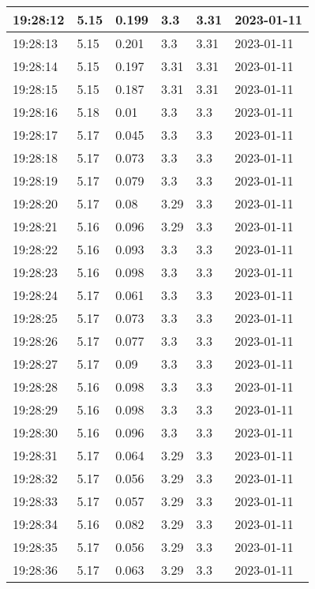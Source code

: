\begin{longtable}{|l|l|l|l|l|l|}
        19:28:12 & 5.15 & 0.199 & 3.3 & 3.31 & 2023-01-11 \\ \hline
        19:28:13 & 5.15 & 0.201 & 3.3 & 3.31 & 2023-01-11 \\ \hline
        19:28:14 & 5.15 & 0.197 & 3.31 & 3.31 & 2023-01-11 \\ \hline
        19:28:15 & 5.15 & 0.187 & 3.31 & 3.31 & 2023-01-11 \\ \hline
        19:28:16 & 5.18 & 0.01 & 3.3 & 3.3 & 2023-01-11 \\ \hline
        19:28:17 & 5.17 & 0.045 & 3.3 & 3.3 & 2023-01-11 \\ \hline
        19:28:18 & 5.17 & 0.073 & 3.3 & 3.3 & 2023-01-11 \\ \hline
        19:28:19 & 5.17 & 0.079 & 3.3 & 3.3 & 2023-01-11 \\ \hline
        19:28:20 & 5.17 & 0.08 & 3.29 & 3.3 & 2023-01-11 \\ \hline
        19:28:21 & 5.16 & 0.096 & 3.29 & 3.3 & 2023-01-11 \\ \hline
        19:28:22 & 5.16 & 0.093 & 3.3 & 3.3 & 2023-01-11 \\ \hline
        19:28:23 & 5.16 & 0.098 & 3.3 & 3.3 & 2023-01-11 \\ \hline
        19:28:24 & 5.17 & 0.061 & 3.3 & 3.3 & 2023-01-11 \\ \hline
        19:28:25 & 5.17 & 0.073 & 3.3 & 3.3 & 2023-01-11 \\ \hline
        19:28:26 & 5.17 & 0.077 & 3.3 & 3.3 & 2023-01-11 \\ \hline
        19:28:27 & 5.17 & 0.09 & 3.3 & 3.3 & 2023-01-11 \\ \hline
        19:28:28 & 5.16 & 0.098 & 3.3 & 3.3 & 2023-01-11 \\ \hline
        19:28:29 & 5.16 & 0.098 & 3.3 & 3.3 & 2023-01-11 \\ \hline
        19:28:30 & 5.16 & 0.096 & 3.3 & 3.3 & 2023-01-11 \\ \hline
        19:28:31 & 5.17 & 0.064 & 3.29 & 3.3 & 2023-01-11 \\ \hline
        19:28:32 & 5.17 & 0.056 & 3.29 & 3.3 & 2023-01-11 \\ \hline
        19:28:33 & 5.17 & 0.057 & 3.29 & 3.3 & 2023-01-11 \\ \hline
        19:28:34 & 5.16 & 0.082 & 3.29 & 3.3 & 2023-01-11 \\ \hline
        19:28:35 & 5.17 & 0.056 & 3.29 & 3.3 & 2023-01-11 \\ \hline
        19:28:36 & 5.17 & 0.063 & 3.29 & 3.3 & 2023-01-11 \\ \hline

\end{longtable}
